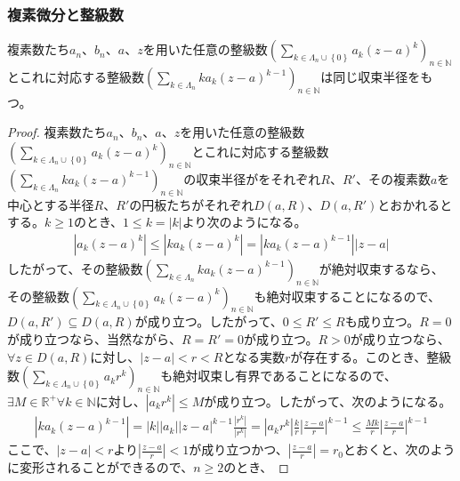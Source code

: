 \documentclass[dvipdfmx]{jsarticle}
\begin{document}
\subsubsection{複素微分と整級数}%
\begin{thm}\label{4.2.8.6}
複素数たち$a_{n}$、$b_{n}$、$a$、$z$を用いた任意の整級数$\left( \sum_{k \in \varLambda_{n} \cup \left\{ 0 \right\}} {a_{k}(z - a)^{k}} \right)_{n \in \mathbb{N}}$とこれに対応する整級数$\left( \sum_{k \in \varLambda_{n}} {ka_{k}(z - a)^{k - 1}} \right)_{n \in \mathbb{N}}$は同じ収束半径をもつ。
\end{thm}
\begin{proof}
複素数たち$a_{n}$、$b_{n}$、$a$、$z$を用いた任意の整級数$\left( \sum_{k \in \varLambda_{n} \cup \left\{ 0 \right\}} {a_{k}(z - a)^{k}} \right)_{n \in \mathbb{N}}$とこれに対応する整級数$\left( \sum_{k \in \varLambda_{n}} {ka_{k}(z - a)^{k - 1}} \right)_{n \in \mathbb{N}}$の収束半径がをそれぞれ$R$、$R'$、その複素数$a$を中心とする半径$R$、$R'$の円板たちがそれぞれ$D(a,R)$、$D\left( a,R' \right)$とおかれるとする。$k \geq 1$のとき、$1 \leq k = |k|$より次のようになる。
\begin{align*}
\left| a_{k}(z - a)^{k} \right| \leq \left| ka_{k}(z - a)^{k} \right| = \left| ka_{k}(z - a)^{k - 1} \right||z - a|
\end{align*}
したがって、その整級数$\left( \sum_{k \in \varLambda_{n}} {ka_{k}(z - a)^{k - 1}} \right)_{n \in \mathbb{N}}$が絶対収束するなら、その整級数$\left( \sum_{k \in \varLambda_{n} \cup \left\{ 0 \right\}} {a_{k}(z - a)^{k}} \right)_{n \in \mathbb{N}}$も絶対収束することになるので、$D\left( a,R' \right) \subseteq D(a,R)$が成り立つ。したがって、$0 \leq R' \leq R$も成り立つ。$R = 0$が成り立つなら、当然ながら、$R = R' = 0$が成り立つ。$R > 0$が成り立つなら、$\forall z \in D(a,R)$に対し、$|z - a| < r < R$となる実数$r$が存在する。このとき、整級数$\left( \sum_{k \in \varLambda_{n} \cup \left\{ 0 \right\}} {a_{k}r^{k}} \right)_{n \in \mathbb{N}}$も絶対収束し有界であることになるので、$\exists M \in \mathbb{R}^{+}\forall k \in \mathbb{N}$に対し、$\left| a_{k}r^{k} \right| \leq M$が成り立つ。したがって、次のようになる。
\begin{align*}
\left| ka_{k}(z - a)^{k - 1} \right| = |k|\left| a_{k} \right||z - a|^{k - 1}\frac{\left| r^{k} \right|}{\left| r^{k} \right|} = \left| a_{k}r^{k} \right|\frac{k}{r}\left| \frac{z - a}{r} \right|^{k - 1} \leq \frac{Mk}{r}\left| \frac{z - a}{r} \right|^{k - 1}
\end{align*}
ここで、$|z - a| < r$より$\left| \frac{z - a}{r} \right| < 1$が成り立つかつ、$\left| \frac{z - a}{r} \right| = r_{0}$とおくと、次のように変形されることができるので、$n \geq 2$のとき、

\end{proof}
\end{document}
